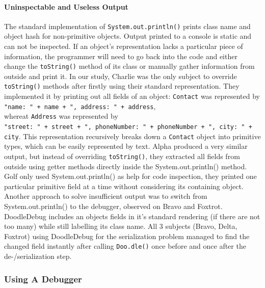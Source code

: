 \documentclass[english]{acm_proc_article-sp}
\begin{document}
\paragraph{Uninspectable and Useless Output}
The standard implementation of \verb-System.out.println()- prints class name and object hash for non-primitive objects. Output printed to a console is static and can not be inspected. If an object's representation lacks a particular piece of information, the programmer will need to go back into the code and either change the \verb.toString(). method of its class or manually gather information from outside and print it. In our study, Charlie was the only subject to override \verb.toString(). methods after firstly using their standard representation. They implemented it by printing out all fields of an object: \verb.Contact. was represented by\\
\verb-"name: " + name + ", address: " + address-,\\
whereat \verb.Address. was represented by\\
\verb-"street: " + street + ", phoneNumber: " + phoneNumber + ", city: " + city-.
This representation recursively breaks down a \verb.Contact. object into primitive types, which can be easily represented by text. Alpha produced a very similar output, but instead of overriding \verb.toString()., they extracted all fields from outside using getter methods directly inside the System.out.println() method. Golf only used System.out.println() as help for code inspection, they printed one particular primitive field at a time without considering its containing object.\\
Another approach to solve insufficient output was to switch from System.out.println() to the debugger, observed on Bravo and Foxtrot.\\
DoodleDebug includes an objects fields in it's standard rendering (if there are not too many) while still labelling its class name. All 3 subjects (Bravo, Delta, Foxtrot) using DoodleDebug for the serialization problem managed to find the changed field instantly after calling \verb-Doo.dle()- once before and once after the de-/serialization step.

\subsubsection{Using A Debugger}
\end{document}
